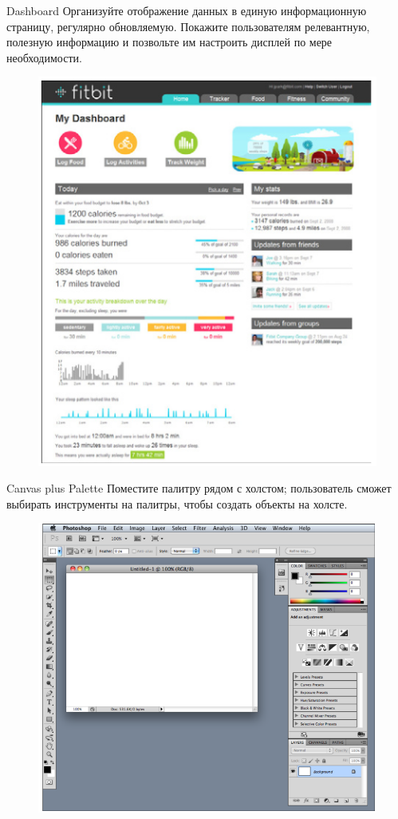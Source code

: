 \documentclass{beamer}
\begin{document}
\begin{frame}[t]{Dashboard}
	Организуйте отображение данных в единую информационную страницу, регулярно обновляемую. Покажите пользователям релевантную, полезную информацию и позвольте им настроить дисплей по мере необходимости.
	\begin{figure}[h]
		\centering
		\includegraphics[scale=0.6]{images/lec07-pic08.png}
	\end{figure}
\end{frame} 

\begin{frame}[t]{Canvas plus Palette}
	Поместите палитру рядом с холстом; пользователь сможет выбирать инструменты на палитры, чтобы создать объекты на холсте.
	\begin{figure}[h]
		\centering
		\includegraphics[scale=0.6]{images/lec07-pic09.png}
	\end{figure}
\end{frame} 
\end{document}
